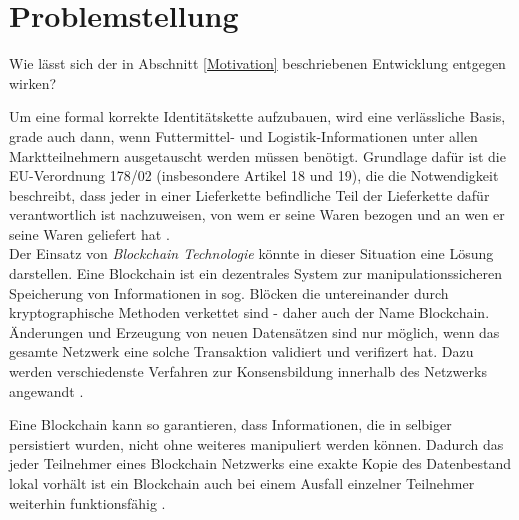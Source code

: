 \section{Problemstellung}

Wie lässt sich der in Abschnitt \ref{Motivation} beschriebenen Entwicklung entgegen wirken?

Um eine formal korrekte Identitätskette aufzubauen, wird eine verlässliche Basis, grade auch dann, wenn Futtermittel- und Logistik-Informationen unter allen Marktteilnehmern ausgetauscht werden müssen benötigt. Grundlage dafür ist die EU-Verordnung 178/02 (insbesondere Artikel 18 und 19), die die Notwendigkeit beschreibt, dass jeder in einer Lieferkette befindliche Teil der Lieferkette dafür verantwortlich ist nachzuweisen, von wem er seine Waren bezogen und an wen er seine Waren geliefert hat \citep{EPER2002}.\\

Der Einsatz von \textit{Blockchain Technologie} könnte in dieser Situation eine Lösung darstellen. Eine Blockchain ist ein dezentrales System zur manipulationssicheren Speicherung von Informationen in sog. Blöcken die untereinander durch kryptographische Methoden verkettet sind - daher auch der Name Blockchain. Änderungen und Erzeugung von neuen Datensätzen sind nur möglich, wenn das gesamte Netzwerk eine solche Transaktion validiert und verifizert hat. Dazu werden verschiedenste Verfahren zur Konsensbildung innerhalb des Netzwerks angewandt \citep[siehe auch][]{Nakamoto2009, Buterin2014, Cardano2017, carVertical}.

Eine Blockchain kann so garantieren, dass Informationen, die in selbiger persistiert wurden, nicht ohne weiteres manipuliert werden können. Dadurch das jeder Teilnehmer eines Blockchain Netzwerks eine exakte Kopie des Datenbestand lokal vorhält ist ein Blockchain auch bei einem Ausfall einzelner Teilnehmer weiterhin funktionsfähig \citep{Drescher2017, Tribis2018}.


